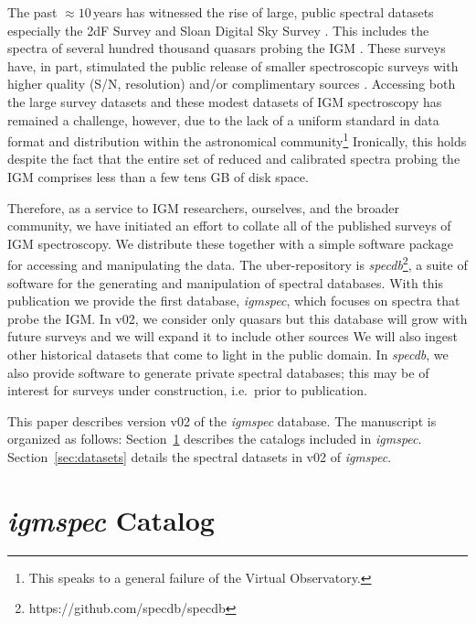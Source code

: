 \documentclass[12pt]{elsarticle}
\begin{document}
The past $\approx 10$\,years has witnessed the
rise of large, public spectral datasets especially
the 2dF Survey and Sloan Digital Sky Survey \citep[SDSS;][]{yaa+00,croom01}.
This includes the spectra of several hundred thousand quasars
probing the IGM \citep{sdss_qso_dr7,boss_dr12Q}.
These surveys have, in part, stimulated the public release
of smaller spectroscopic surveys with higher quality
(S/N, resolution) and/or complimentary sources
\citep[e.g.][]{pwh+07,prochaska+15}.
Accessing both the large survey datasets 
and these modest datasets of IGM spectroscopy
has remained a challenge, however, due to the lack of a
uniform standard in data format and distribution within the astronomical
community\footnote{This speaks to a general failure of the
Virtual Observatory.}
Ironically, this holds despite the fact that the entire set of
reduced and calibrated spectra probing the IGM 
comprises less than a few tens GB of disk space.

Therefore, as a service to IGM researchers, ourselves, and the
broader community, we have initiated an effort to collate 
all of the published surveys of IGM spectroscopy. We distribute
these together with a simple software package
for accessing and manipulating the data.  
The uber-repository is {\it specdb}\footnote{https://github.com/specdb/specdb}, 
a suite of software
for the generating and manipulation of spectral databases.
With this publication we provide the first database,
{\it igmspec}, which focuses on spectra that probe the IGM. 
In v02, we consider only quasars but 
this database will grow with future surveys 
and we will expand it to include other sources
\citep[e.g. gamma-ray burst afterglow spectra, star-forming
galaxies, supernovae;][]{fjp+09,rpk+10,cooke+12}
We will also ingest other historical 
datasets that come to light in
the public domain.  
In {\it specdb}, we also provide 
software to generate private spectral databases; 
this may be of interest for surveys 
under construction, i.e.\ prior to publication.

This paper describes version v02 of the {\it igmspec}
database.  The manuscript is organized as follows:
Section~\ref{sec:catalog} describes the catalogs
included in {\it igmspec}.
Section~\ref{sec:datasets} details the spectral datasets
in v02 of {\it igmspec}.



\section{{\it igmspec} Catalog}
\label{sec:catalog}
\end{document}
